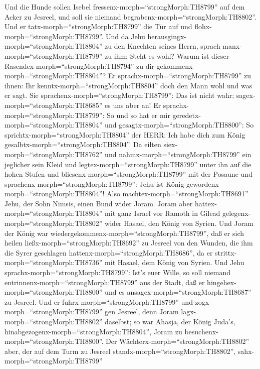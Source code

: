  Und die Hunde sollen Isebel
fressenx-morph=``strongMorph:TH8799'' auf dem Acker zu Jesreel, und soll
sie niemand begrabenx-morph=``strongMorph:TH8802''. Und er
tatx-morph=``strongMorph:TH8799'' die Tür auf und
flohx-morph=``strongMorph:TH8799''.  Und da Jehu
herausgingx-morph=``strongMorph:TH8804'' zu den Knechten seines Herrn,
sprach manx-morph=``strongMorph:TH8799'' zu ihm: Steht es wohl? Warum
ist dieser Rasendex-morph=``strongMorph:TH8794'' zu dir
gekommenx-morph=``strongMorph:TH8804''? Er
sprachx-morph=``strongMorph:TH8799'' zu ihnen: Ihr
kenntx-morph=``strongMorph:TH8804'' doch den Mann wohl und was er sagt.
 Sie sprachenx-morph=``strongMorph:TH8799'': Das ist nicht
wahr; sagex-morph=``strongMorph:TH8685'' es uns aber an! Er
sprachx-morph=``strongMorph:TH8799'': So und so hat er mir
geredetx-morph=``strongMorph:TH8804'' und
gesagtx-morph=``strongMorph:TH8800'': So
sprichtx-morph=``strongMorph:TH8804'' der HERR: Ich habe dich zum König
gesalbtx-morph=``strongMorph:TH8804''.  Da eilten
siex-morph=``strongMorph:TH8762'' und nahmx-morph=``strongMorph:TH8799''
ein jeglicher sein Kleid und legtex-morph=``strongMorph:TH8799'' unter
ihn auf die hohen Stufen und bliesenx-morph=``strongMorph:TH8799'' mit
der Posaune und sprachenx-morph=``strongMorph:TH8799'': Jehu ist König
gewordenx-morph=``strongMorph:TH8804''!  Also
machtex-morph=``strongMorph:TH8691'' Jehu, der Sohn Nimsis, einen Bund
wider Joram. Joram aber hattex-morph=``strongMorph:TH8804'' mit ganz
Israel vor Ramoth in Gilead gelegenx-morph=``strongMorph:TH8802'' wider
Hasael, den König von Syrien.  Und Joram der König war
wiedergekommenx-morph=``strongMorph:TH8799'', daß er sich heilen
ließx-morph=``strongMorph:TH8692'' zu Jesreel von den Wunden, die ihm
die Syrer geschlagen hattenx-morph=``strongMorph:TH8686'', da er
strittx-morph=``strongMorph:TH8736'' mit Hasael, dem König von Syrien.
Und Jehu sprachx-morph=``strongMorph:TH8799'': Ist's euer Wille, so soll
niemand entrinnenx-morph=``strongMorph:TH8799'' aus der Stadt, daß er
hingehex-morph=``strongMorph:TH8800'' und es
ansagex-morph=``strongMorph:TH8687'' zu Jesreel.  Und er
fuhrx-morph=``strongMorph:TH8799'' und zogx-morph=``strongMorph:TH8799''
gen Jesreel, denn Joram lagx-morph=``strongMorph:TH8802'' daselbst; so
war Ahasja, der König Juda's,
hinabgezogenx-morph=``strongMorph:TH8804'', Joram zu
besuchenx-morph=``strongMorph:TH8800''.  Der
Wächterx-morph=``strongMorph:TH8802'' aber, der auf dem Turm zu Jesreel
standx-morph=``strongMorph:TH8802'', sahx-morph=``strongMorph:TH8799''
